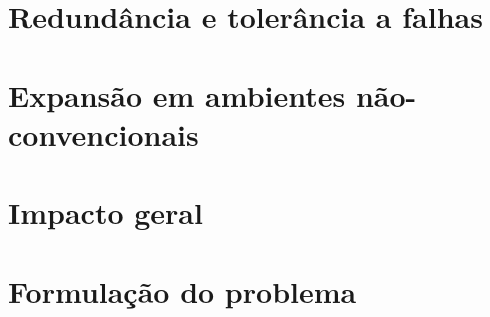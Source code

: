 



\section{Redundância e tolerância a falhas}


\section{Expansão em ambientes não-convencionais}




\section{Impacto geral}


\section{Formulação do problema}






%

%

%











